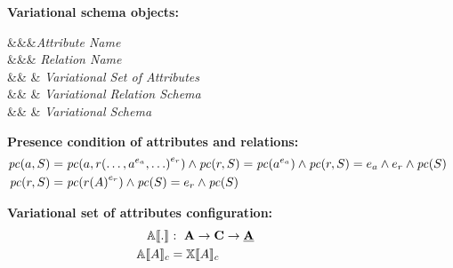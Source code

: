 \begin{figure}

\textbf{Variational schema objects:}
\begin{syntax}
\synDef \vAtt \attNames &&&\textit{Attribute Name}\\
\synDef \vRel \relNames &&& \textit{Relation Name}\\
\synDef {} &\eqq& 
 & \textit{Variational Set of Attributes}\\
\synDef \vRelSch \vRelSchSet &\eqq& \vRelDef & \textit{Variational Relation Schema}\\
\synDef \vSch \vSchSet &\eqq& \vSchDef & \textit{Variational Schema}
\end{syntax}

\medskip
\textbf{Presence condition of attributes and relations:}
\begin{alignat*}{1}
\getPCfrom {\vAtt} {\vSch} &= \getPCfrom {\vAtt} {\vRel \annot [\dimMeta_\vRel] {(\ldots, \annot [\dimMeta_\vAtt] \vAtt, \ldots)}} \wedge \getPCfrom \vRel \vSch = \getPC {\annot [\dimMeta_\vAtt] \vAtt} \wedge \getPCfrom \vRel \vSch=
\dimMeta_\vAtt \wedge \dimMeta_\vRel \wedge \getPC \vSch\\
\getPCfrom {\vRel} \vSch &= \getPC {\vRel \annot [\dimMeta_\vRel] {(\vAttList)}} \wedge \getPC {\vSch} = \dimMeta_\vRel \wedge \getPC \vSch
\end{alignat*}

\medskip
\textbf{Variational set of attributes configuration:}
\begin{alignat*}{1}
 \olSem [] . &: \ \vAttSet \to \confSet \to \pAttSet\\
 \olSem \vAttList &= \elemSem \vAttList
 \end{alignat*}


\end{figure}

